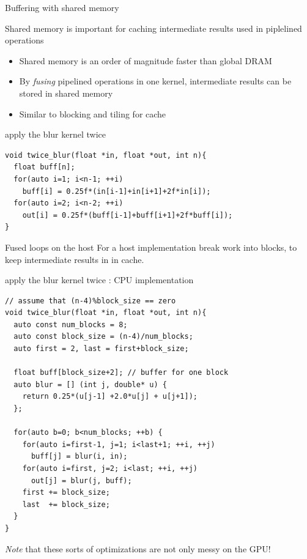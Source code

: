 \begin{frame}[fragile]{Buffering with shared memory}
    \begin{info}{}
        Shared memory is important for caching intermediate results used in piplelined operations
        \begin{itemize}
            \item Shared memory is an order of magnitude faster than global DRAM
            \item By \emph{fusing} pipelined operations in one kernel, intermediate results can be stored in shared memory
            \item Similar to blocking and tiling for cache
        \end{itemize}
    \end{info}

    \begin{code}{apply the blur kernel twice}
        \begin{lstlisting}[style=boxcudatiny]
void twice_blur(float *in, float *out, int n){
  float buff[n];
  for(auto i=1; i<n-1; ++i)
    buff[i] = 0.25f*(in[i-1]+in[i+1]+2f*in[i]);
  for(auto i=2; i<n-2; ++i)
    out[i] = 0.25f*(buff[i-1]+buff[i+1]+2f*buff[i]);
}
        \end{lstlisting}
    \end{code}

\end{frame}

\begin{frame}[fragile]{Fused loops on the host}
    For a host implementation break work into blocks, to keep intermediate results in  in cache.
    \begin{code}{apply the blur kernel twice : CPU implementation}
        \begin{lstlisting}[style=boxcudatiny]
// assume that (n-4)%block_size == zero
void twice_blur(float *in, float *out, int n){
  auto const num_blocks = 8;
  auto const block_size = (n-4)/num_blocks;
  auto first = 2, last = first+block_size;

  float buff[block_size+2]; // buffer for one block
  auto blur = [] (int j, double* u) {
    return 0.25*(u[j-1] +2.0*u[j] + u[j+1]);
  };

  for(auto b=0; b<num_blocks; ++b) {
    for(auto i=first-1, j=1; i<last+1; ++i, ++j)
      buff[j] = blur(i, in);
    for(auto i=first, j=2; i<last; ++i, ++j)
      out[j] = blur(j, buff);
    first += block_size;
    last  += block_size;
  }
}
        \end{lstlisting}
    \end{code}
    \emph{Note} that these sorts of optimizations are not only messy on the GPU!
\end{frame}

